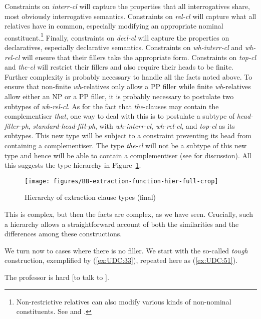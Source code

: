 \documentclass[output=paper
,notxmath 
 	        ,biblatex
                ,babelshorthands
                ,newtxmath
                ,draftmode
                ,colorlinks, citecolor=brown
]{langscibook}
\begin{document}
\noindent
Constraints on \emph{interr-cl} will capture the properties that all
interrogatives share, most obviously interrogative semantics.
Constraints on \emph{rel-cl} will capture what all relatives have in
common, especially modifying an appropriate nominal
constituent.\footnote{Non-restrictive relatives can also modify various
  kinds of non-nominal constituents. See \citet{Arnold:04} and
  \citet{Arnold:Borsley:08}.%
} Finally, constraints on \emph{decl-cl}
will capture the properties on declaratives, especially declarative
semantics.  Constraints on \emph{wh-interr-cl} and \emph{wh-rel-cl}
will ensure that their fillers take the appropriate form. Constraints
on \emph{top-cl} and \emph{the-cl} will restrict their fillers and
also require their heads to be finite. Further complexity is probably
necessary to handle all the facts noted above. To ensure that
non-finite \emph{wh}-relatives only allow a PP filler while finite
\emph{wh}-relatives allow either an NP or a PP filler, it is probably
necessary to postulate two subtypes of \emph{wh-rel-cl}. As for the
fact that \emph{the}-clauses may contain the complementiser
\emph{that}, one way to deal with this is to postulate a subtype of
\emph{head-filler-ph}, \emph{standard-head-fill-ph}, with
\emph{wh-interr-cl}, \emph{wh-rel-cl}, and \emph{top-cl} as its
subtypes. This new type will be subject to a constraint preventing its
head from containing a complementiser. The type \emph{the-cl} will not
be a subtype of this new type and hence will be able to contain a
complementiser (see \citealt[13--15]{Borsley:11} for discussion). All this suggests
the type hierarchy in Figure~\ref{fig:UDC:50}. 
%
\begin{figure}
  \centering
  \texttt{[image: figures/BB-extraction-function-hier-full-crop]}
  \caption{\label{fig:UDC:50}Hierarchy of extraction clause types (final)}
  
\end{figure}
%
%
This is complex, but then the facts are complex, as we have seen.
Crucially, such a hierarchy allows a straightforward account of both the
similarities and the differences among these constructions.

We turn now to cases where there is no filler. We start with the
so-called \emph{tough} construction, exemplified by (\ref{ex:UDC:33}), repeated here as
(\ref{ex:UDC:51}).

\begin{exe}
\ex \label{ex:UDC:51}
The professor is hard [to talk to \trace{}].
\end{exe}
\end{document}
